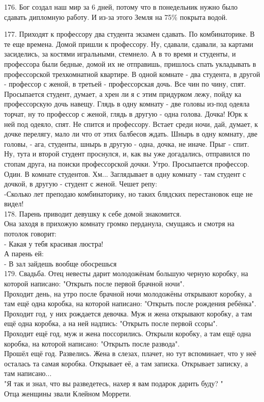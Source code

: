 \documentclass[a4paper,20pt,notitlepage]{extbook}
\begin{document}
	176. Бог создал наш мир за 6 дней, потому что в понедельник нужно было сдавать дипломную работу. И из-за этого Земля на 75\% покрыта водой.
	
	177. Приходят к профессору два студента экзамен сдавать. По комбинаторике. В те еще времена. Домой пришли к профессору. Ну, сдавали, сдавали, за картами засиделись, за костями игральными, стемнело. А в то время и студенты, и профессора были бедные, домой их не отправишь, пришлось спать укладывать в профессорской трехкомнатной квартире. В одной комнате - два студента, в другой - профессор с женой, в третьей - профессорская дочь. Все чин по чину, спят. Просыпается студент, думает, а хрен ли я с этим придурком лежу, пойду ка профессорскую дочь навещу. Глядь в одну комнату - две головы из-под одеяла торчат, ну то профессор с женой, глядь в другую - одна голова. Дочка! Юрк к ней под одеяло, спят. Не спится и профессору. Встает среди ночи, дай, думает, к дочке перелягу, мало ли что от этих балбесов ждать. Шнырь в одну комнату, две
	головы, - ага, студенты, шнырь в другую - одна, дочка, не иначе. Прыг - спит. Ну, тута и второй студент проснулся, и, как вы уже догадались, отправился по стопам друга, на поиски профессорской дочки. Утро. Просыпается профессор. Один. В комнате студентов. Хм... Заглядывает в одну комнату - там студент с дочкой, в другую - студент с женой. Чешет репу:\\
	-Сколько лет преподаю комбинаторику, но таких блядских перестановок еще не видел!\\
	
	178. Парень приводит девушку к себе домой знакомится.\\
	Она заходя в прихожую комнату громко перданула, смущаясь и смотря на потолок говорит:\\
	- Какая у тебя красивая люстра!\\
	А парень ей:\\
	- В зал зайдешь вообще обосрешься\\
	
	179. Свадьба.
	Отец невесты дарит молодожёнам большую черную коробку, на которой написано: "Открыть после первой брачной ночи".\\
	Проходит день, на утро после брачной ночи молодожёны открывают коробку, а там ещё одна коробка, на которой написано: "Открыть после рождения ребёнка".\\
	Проходит год, у них рождается девочка. Муж и жена открывают коробку, а там ещё одна коробка, а на ней надпись: "Открыть после первой ссоры".\\
	Проходит ещё год, муж и жена поссорились. Открыли коробку, а там ещё одна коробка, на которой написано: "Открыть после развода".\\
	Прошёл ещё год. Развелись. Жена в слезах, плачет, но тут вспоминает, что у неё осталась та самая коробка. Открывает её, а там записка. Открывает записку, а там написано...\\
	"Я так и знал, что вы разведетесь, нахер я вам подарок дарить буду? "\\
	Отца женщины звали Клейном Моррети.\\
	
\end{document}
